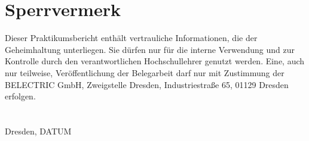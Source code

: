 \chapter*{Sperrvermerk}\thispagestyle{empty}

Dieser Praktikumsbericht enthält vertrauliche Informationen, die der Geheimhaltung unterliegen. Sie dürfen nur für die interne Verwendung und zur Kontrolle durch den verantwortlichen Hochschullehrer genutzt werden. Eine, auch nur teilweise, Veröffentlichung der Belegarbeit darf nur mit Zustimmung der BELECTRIC GmbH, Zweigstelle Dresden, Industriestraße 65, 01129 Dresden erfolgen.
\\ 
\\
\\
{\LARGE Dresden, DATUM}\\
